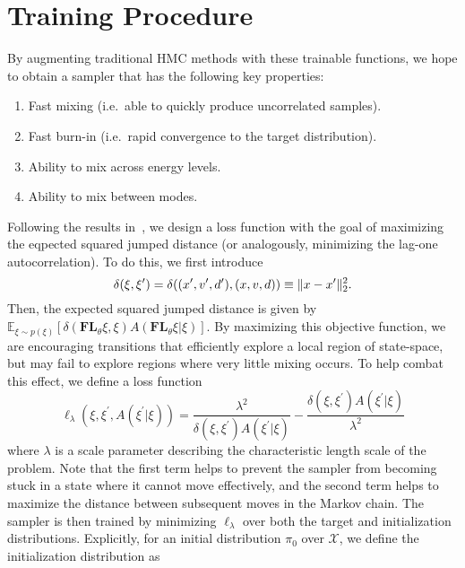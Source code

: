 \documentclass[main.tex]{subfiles}
\begin{document}
%
\section{Training Procedure}
%
By augmenting traditional HMC methods with these trainable functions, we hope to obtain a sampler that has the
following key properties:
%
\begin{enumerate}
    \item Fast mixing (i.e.\ able to quickly produce uncorrelated samples).
    \item Fast burn-in (i.e.\ rapid convergence to the target distribution).
    \item Ability to mix across energy levels.
    \item Ability to mix between modes.
\end{enumerate}
%
Following the results in~\cite{10.2307/24308995}, we design a loss function with the goal of maximizing the eqpected
squared jumped distance (or analogously, minimizing the lag-one autocorrelation).
%
To do this, we first introduce 
\begin{equation}
  \delta(\xi, {\xi^{\prime}}) = \delta((x^{\prime}, v^{\prime}, d^{\prime}), (x, v, d)) \equiv \| x - x^{\prime}\|^2_2.
  \label{eq:metric_orig}
\end{equation}
%
Then, the expected squared jumped distance is given by $\mathbb{E}_{\xi\sim p(\xi)}
\left[\delta(\mathbf{FL}_{\theta}\xi, \xi) A(\mathbf{FL}_{\theta}\xi | \xi)\right]$.
%
By maximizing this objective function, we are encouraging transitions that efficiently explore a local region of
state-space, but may fail to explore regions where very little mixing occurs.
%
To help combat this effect, we define a loss function
%
\begin{equation}
    \ell_{\lambda}(\xi, \xi^{\prime}, A(\xi^{\prime}|\xi)) =
        \frac{\lambda^2}{\delta(\xi,\xi^{\prime}) A(\xi^{\prime}|\xi)} -
        \frac{\delta(\xi,\xi^{\prime}) A(\xi^{\prime}|\xi)}{\lambda^2}
    \label{eq:loss_ell}
\end{equation}
%
where $\lambda$ is a scale parameter describing the characteristic length scale of the problem.
%
Note that the first term helps to prevent the sampler from becoming stuck in a state where it cannot move effectively,
and the second term helps to maximize the distance between subsequent moves in the Markov chain.  The sampler is then
trained by minimizing $\ell_{\lambda}$ over both the target and initialization distributions.
%
Explicitly, for an initial distribution $\pi_0$ over $\mathcal{X}$, we define the initialization distribution as
\end{document}
